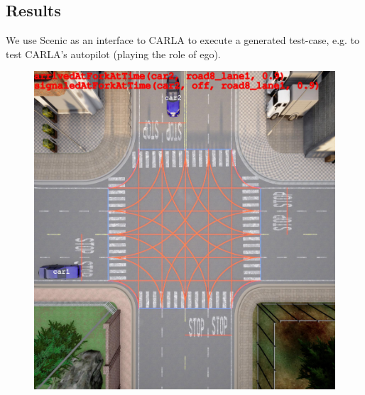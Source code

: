 \subsection{Results}
We use Scenic \cite{Fremont.2023} as an interface to CARLA to execute a generated test-case, e.g. to test CARLA's autopilot (playing the role of ego).


\begin{figure}[ht]%
  \centering
  \begin{minipage}[t]{.499\linewidth}
    {\includegraphics[width=\linewidth]{figures/chapter4/2_18.jpg}}%
  \end{minipage}%
  \hfill
  \begin{minipage}[t]{.499\linewidth}

\end{minipage}
\end{figure}
